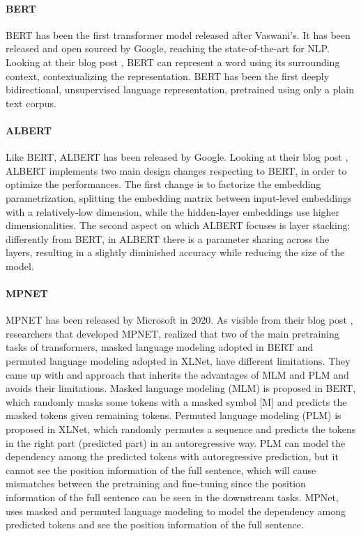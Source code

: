 \documentclass[\main/main.tex]{subfiles}
\begin{document}
\paragraph{BERT}
BERT has been the first transformer model released after Vaswani's. It has been released and open sourced by Google, reaching the state-of-the-art for NLP. Looking at their blog post \cite{bert_blog_post}, BERT can represent a word using its surrounding context, contextualizing the representation. BERT has been the first deeply bidirectional, unsupervised language representation, pretrained using only a plain text corpus\cite{DBLP:journals/corr/abs-1810-04805}.
\paragraph{ALBERT}
Like BERT, ALBERT has been released by Google. Looking at their blog post \cite{albert_blog_post}, ALBERT implements two main design changes respecting to BERT, in order to optimize the performances. The first change is to factorize the embedding parametrization, splitting the embedding matrix between input-level embeddings with a relatively-low dimension, while the hidden-layer embeddings use higher dimensionalities. The second aspect on which ALBERT focuses is layer stacking: differently from BERT, in ALBERT there is a parameter sharing across the layers, resulting in a slightly diminished accuracy while reducing the size of the model\cite{DBLP:journals/corr/abs-1909-11942}.
\paragraph{MPNET}
MPNET has been released by Microsoft in 2020. As visible from their blog post \cite{mpnet_blog_post},  researchers that developed MPNET, realized that two of the main pretraining tasks of transformers, masked language modeling adopted in BERT and permuted language modeling adopted in XLNet, have different limitations. They came up with and approach that inherits the advantages of MLM and PLM and avoids their limitations. Masked language modeling (MLM) is proposed in BERT, which randomly masks some tokens with a masked symbol [M] and predicts the masked tokens given remaining tokens. Permuted language modeling (PLM) is proposed in XLNet, which randomly permutes a sequence and predicts the tokens in the right part (predicted part) in an autoregressive way. PLM can model the dependency among the predicted tokens with autoregressive prediction, but it cannot see the position information of the full sentence, which will cause mismatches between the pretraining and fine-tuning since the position information of the full sentence can be seen in the downstream tasks. MPNet, uses masked and permuted language modeling to model the dependency among predicted tokens and see the position information of the full sentence\cite{DBLP:journals/corr/abs-2004-09297}.
\end{document}
